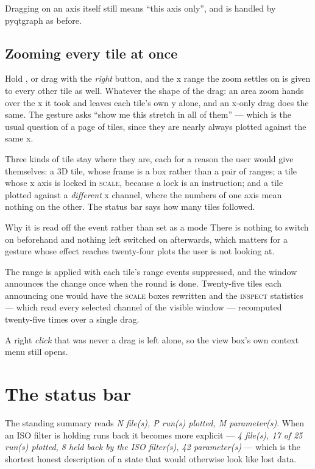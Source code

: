 \documentclass[11pt,a4paper,oneside]{report}
\newcommand{\key}[1]{\textsf{\small\fbox{#1}}}
\newcommand{\tab}[1]{\textsc{#1}}
\begin{document}
Dragging on an axis itself still means ``this axis only'', and is handled by
pyqtgraph as before.

\subsection*{Zooming every tile at once}
\label{sec:globalzoom}

Hold \key{Ctrl}, or drag with the \emph{right} button, and the x range the zoom
settles on is given to every other tile as well. Whatever the shape of the drag:
an area zoom hands over the x it took and leaves each tile's own y alone, and an
x-only drag does the same. The gesture asks ``show me this stretch in all of
them'' --- which is the usual question of a page of tiles, since they are
nearly always plotted against the same x.

Three kinds of tile stay where they are, each for a reason the user would give
themselves: a 3D tile, whose frame is a box rather than a pair of ranges; a tile
whose x axis is locked in \tab{scale}, because a lock is an instruction; and a
tile plotted against a \emph{different} x channel, where the numbers of one
axis mean nothing on the other. The status bar says how many tiles followed.

\begin{aoenote}{Why it is read off the event rather than set as a mode}
There is nothing to switch on beforehand and nothing left switched on
afterwards, which matters for a gesture whose effect reaches twenty-four plots
the user is not looking at.

The range is applied with each tile's range events suppressed, and the window
announces the change once when the round is done. Twenty-five tiles each
announcing one would have the \tab{scale} boxes rewritten and the \tab{inspect}
statistics --- which read every selected channel of the visible window ---
recomputed twenty-five times over a single drag.

A right \emph{click} that was never a drag is left alone, so the view box's own
context menu still opens.
\end{aoenote}

\section{The status bar}
\label{sec:statusbar}

The standing summary reads \emph{N file(s), P run(s) plotted, M parameter(s)}.
When an ISO filter is holding runs back it becomes more explicit ---
\emph{4 file(s), 17 of 25 run(s) plotted, 8 held back by the ISO filter(s), 42
parameter(s)} --- which is the shortest honest description of a state that would
otherwise look like lost data.
\end{document}
